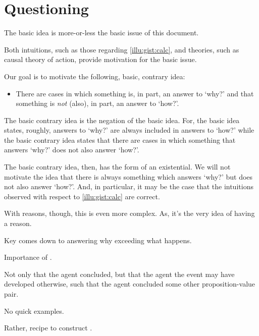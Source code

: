 \section*{Questioning \issueInclusion{}}

\begin{note}
  The basic idea is more-or-less the basic issue of this document.

  Both intuitions, such as those regarding \autoref{illu:gist:calc}, and theories, such as \citeauthor{Davidson:1963aa} causal theory of action, provide motivation for the basic issue.

  Our goal is to motivate the following, basic, contrary idea:

  \begin{itemize}
  \item
    There are cases in which something is, in part, an answer to `why?' and that something is \emph{not} (also), in part, an answer to `how?'.
  \end{itemize}

  The basic contrary idea is the negation of the basic idea.
  For, the basic idea states, roughly, answers to `why?' are always included in answers to `how?' while the basic contrary idea states that there are cases in which something that answers `why?' does not also answer `how?'.

  The basic contrary idea, then, has the form of an existential.
  We will not motivate the idea that there is always something which answers `why?' but does not also answer `how?'.
  And, in particular, it may be the case that the intuitions observed with respect to \autoref{illu:gist:calc} are correct.
\end{note}

\begin{note}
  With reasons, though, this is even more complex.
  As, it's the very idea of having a reason.
\end{note}

\begin{note}
  Key comes down to answering why exceeding what happens.

  Importance of \fc{}.

  Not only that the agent concluded, but that the agent the event may have developed otherwise, such that the agent concluded some other proposition-value pair.
\end{note}

\begin{note}
  No quick examples.

  Rather, recipe to construct .
\end{note}

